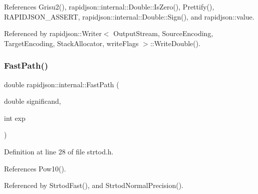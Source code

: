 References Grisu2(), rapidjson\+::internal\+::\+Double\+::\+Is\+Zero(), Prettify(), R\+A\+P\+I\+D\+J\+S\+O\+N\+\_\+\+A\+S\+S\+E\+RT, rapidjson\+::internal\+::\+Double\+::\+Sign(), and rapidjson\+::value.



Referenced by rapidjson\+::\+Writer$<$ Output\+Stream, Source\+Encoding, Target\+Encoding, Stack\+Allocator, write\+Flags $>$\+::\+Write\+Double().

\mbox{\label{namespacerapidjson_1_1internal_aadfc08b386baffa85f618e0ef0e2f188}} 
\subsubsection{\texorpdfstring{FastPath()}{FastPath()}}
{\footnotesize\ttfamily double rapidjson\+::internal\+::\+Fast\+Path (\begin{DoxyParamCaption}\item[{double}]{significand,  }\item[{int}]{exp }\end{DoxyParamCaption})}



Definition at line 28 of file strtod.\+h.


\begin{DoxyCode}{0}

\end{DoxyCode}


References Pow10().



Referenced by Strtod\+Fast(), and Strtod\+Normal\+Precision().

